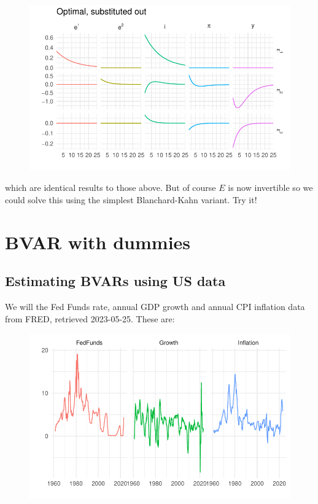 \documentclass[
  letterpaper,
]{book}
\begin{document}
\begin{figure}[H]

{\centering \includegraphics{./BK_files/figure-pdf/unnamed-chunk-35-1.pdf}

}

\end{figure}

which are identical results to those above. But of course \(E\) is now
invertible so we could solve this using the simplest Blanchard-Kahn
variant. Try it!

\hypertarget{bvar-with-dummies}{%
\chapter{BVAR with dummies}\label{bvar-with-dummies}}

\hypertarget{estimating-bvars-using-us-data}{%
\section{Estimating BVARs using US
data}\label{estimating-bvars-using-us-data}}

We will the Fed Funds rate, annual GDP growth and annual CPI inflation
data from FRED, retrieved 2023-05-25. These are:

\begin{figure}

{\centering \includegraphics{./BVAR_files/figure-pdf/unnamed-chunk-2-1.pdf}

}

\end{figure}
\end{document}
